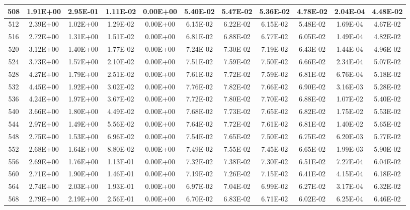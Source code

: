 \begin{landscape}
\begin{longtable}{c||c|c|c|c|c|c|c|c|c|c}
        508 & 1.91E+00 & 2.95E-01 & 1.11E-02 & 0.00E+00 & 5.40E-02 & 5.47E-02 & 5.36E-02 & 4.78E-02 & 2.04E-04 & 4.48E-02 \\ \hline
        512 & 2.39E+00 & 1.02E+00 & 1.29E-02 & 0.00E+00 & 6.15E-02 & 6.22E-02 & 6.15E-02 & 5.48E-02 & 1.69E-04 & 4.67E-02 \\ \hline
        516 & 2.72E+00 & 1.31E+00 & 1.51E-02 & 0.00E+00 & 6.81E-02 & 6.88E-02 & 6.77E-02 & 6.05E-02 & 1.49E-04 & 4.82E-02 \\ \hline
        520 & 3.12E+00 & 1.40E+00 & 1.77E-02 & 0.00E+00 & 7.24E-02 & 7.30E-02 & 7.19E-02 & 6.43E-02 & 1.44E-04 & 4.96E-02 \\ \hline
        524 & 3.73E+00 & 1.57E+00 & 2.10E-02 & 0.00E+00 & 7.51E-02 & 7.59E-02 & 7.50E-02 & 6.66E-02 & 2.34E-04 & 5.07E-02 \\ \hline
        528 & 4.27E+00 & 1.79E+00 & 2.51E-02 & 0.00E+00 & 7.61E-02 & 7.72E-02 & 7.59E-02 & 6.81E-02 & 6.76E-04 & 5.18E-02 \\ \hline
        532 & 4.45E+00 & 1.92E+00 & 3.02E-02 & 0.00E+00 & 7.76E-02 & 7.82E-02 & 7.66E-02 & 6.90E-02 & 3.16E-03 & 5.28E-02 \\ \hline
        536 & 4.24E+00 & 1.97E+00 & 3.67E-02 & 0.00E+00 & 7.72E-02 & 7.80E-02 & 7.70E-02 & 6.88E-02 & 1.07E-02 & 5.40E-02 \\ \hline
        540 & 3.66E+00 & 1.80E+00 & 4.49E-02 & 0.00E+00 & 7.68E-02 & 7.73E-02 & 7.65E-02 & 6.82E-02 & 1.75E-02 & 5.53E-02 \\ \hline
        544 & 2.97E+00 & 1.49E+00 & 5.56E-02 & 0.00E+00 & 7.64E-02 & 7.72E-02 & 7.61E-02 & 6.81E-02 & 1.40E-02 & 5.65E-02 \\ \hline
        548 & 2.75E+00 & 1.53E+00 & 6.96E-02 & 0.00E+00 & 7.54E-02 & 7.65E-02 & 7.50E-02 & 6.75E-02 & 6.20E-03 & 5.77E-02 \\ \hline
        552 & 2.68E+00 & 1.64E+00 & 8.80E-02 & 0.00E+00 & 7.49E-02 & 7.55E-02 & 7.45E-02 & 6.65E-02 & 1.99E-03 & 5.90E-02 \\ \hline
        556 & 2.69E+00 & 1.76E+00 & 1.13E-01 & 0.00E+00 & 7.32E-02 & 7.38E-02 & 7.30E-02 & 6.51E-02 & 7.27E-04 & 6.04E-02 \\ \hline
        560 & 2.71E+00 & 1.90E+00 & 1.46E-01 & 0.00E+00 & 7.19E-02 & 7.26E-02 & 7.15E-02 & 6.41E-02 & 4.15E-04 & 6.18E-02 \\ \hline
        564 & 2.74E+00 & 2.03E+00 & 1.93E-01 & 0.00E+00 & 6.97E-02 & 7.04E-02 & 6.99E-02 & 6.27E-02 & 3.17E-04 & 6.32E-02 \\ \hline
        568 & 2.79E+00 & 2.19E+00 & 2.56E-01 & 0.00E+00 & 6.70E-02 & 6.83E-02 & 6.71E-02 & 6.02E-02 & 6.25E-04 & 6.46E-02 \\ \hline

\end{longtable}
\end{landscape}
